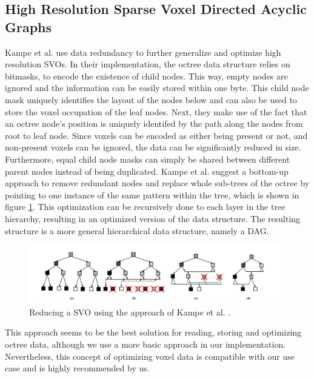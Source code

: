 \subsection*{High Resolution Sparse Voxel Directed Acyclic Graphs} \label{subsec-highres-svo-dags}

Kampe et al. \cite{Kampe2013} use data redundancy to further generalize and optimize high resolution 
\ac{SVO}s. In their implementation, the octree data structure relies on bitmasks, to encode the existence of child 
nodes. This way, empty nodes are ignored and the information can be easily stored within one byte. This child node 
mask uniquely identifies the layout of the nodes below and can also be used to store the voxel occupation of the 
leaf nodes. Next, they make use of the fact that an octree node's position is uniquely identifed by the path along 
the nodes from root to leaf node. Since voxels can be encoded as either being present or not, and non-present 
voxels can be ignored, the data can be significantly reduced in size. Furthermore, equal child node masks 
can simply be shared between different parent nodes instead of being duplicated. Kampe et al. \cite{Kampe2013} 
suggest a bottom-up approach to remove redundant nodes and replace whole sub-trees of the octree by pointing to one 
instance of the same pattern within the tree, which is shown in figure \ref{fig:sparse-voxel-dag-creation}. 
This optimization can be recursively done to each layer in the tree hierarchy, resulting in an optimized version 
of the data structure. The resulting structure is a more general hierarchical data structure, namely a \ac{DAG}.

\begin{figure}[h]
    \centering
    \includegraphics[width=\linewidth]{images/graphics/highres-sv-dag.jpg}
    \caption{Reducing a \ac{SVO} using the approach of Kampe et al. \cite{Kampe2013}.}
    \label{fig:sparse-voxel-dag-creation}
\end{figure}

\noindent
This approach seems to be the best solution for reading, storing and optimizing octree data, although we use 
a more basic approach in our implementation. Nevertheless, this concept of optimizing voxel data is compatible 
with our use case and is highly recommended by us.


